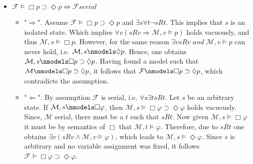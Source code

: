 \documentclass[11pt,a4paper]{article}
\newcommand{\lto}{\supset}
\newcommand{\some}{\Diamond}
\newcommand{\all}{\Box}
\newcommand{\sand}{\; and \;}
\newcommand{\sto}{\Rightarrow}
\begin{document}
\begin{itemize}
\item $\mathcal{F} \models \all p \lto \some p \iff \mathcal{F} \mathit{serial}$ 
\begin{itemize}
\item "$\Rightarrow$". Assume $\mathcal{F} \models \all p \lto \some p$ and $\exists s \forall t \neg sRt$. This implies that $s$ is an isolated state. Which implies $\forall v (sRv \sto \mathcal{M}, v\models p)$ holds vacuously, and thus $\mathcal{M}, s \models \all p$. However, for the same reason $\exists v sRv \sand \mathcal{M}, v\models p$ can never hold, i.e. $\mathcal{M}, s \nmodels \some p$. Hence, one obtains $\mathcal{M}, s \nmodels  \all p \lto \some p$. Having found a model such that $\mathcal{M} \nmodels  \all p \lto \some p$, it follows that $\mathcal{F} \nmodels  \all p \lto \some p$, which contradicts the assumption.
\item "$\Leftarrow$". By assumption $\mathcal{F}$ is serial, i.e. $\forall s \exists t sRt$. Let $s$ be an arbitrary state. If $\mathcal{M},s \nmodels \all \varphi$, then $\mathcal{M},s \models \all\varphi \lto \some \varphi$ holds vacuously. Since, $\mathcal{M}$ serial, there must be a $t$ such that $sRt$. Now given  $\mathcal{M},s \models \all \varphi$ it must be by semantics of $\all$ that $\mathcal{M}, t \models \varphi$. Therefore, due to $sRt$ one obtains $\exists v (sRv \land \mathcal{M}, v \models \varphi)$, which leads to $\mathcal{M}, s\models  \some \varphi $. Since $s$ is arbitrary and no variable assignment was fixed, it follows $\mathcal{F} \models \all \varphi \lto \some \varphi$.
\end{itemize}

%


\end{itemize}
\end{document}
